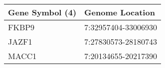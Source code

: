 \begin{tabular}{ll}
\toprule
Gene Symbol (4) &     Genome Location \\
\midrule
          FKBP9 & 7:32957404-33006930 \\
          JAZF1 & 7:27830573-28180743 \\
          MACC1 & 7:20134655-20217390 \\
\bottomrule
\end{tabular}
